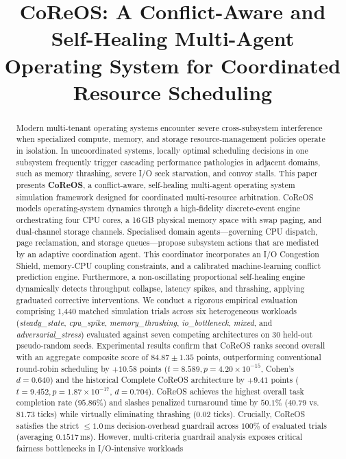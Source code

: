 \documentclass[conference]{IEEEtran}
\begin{document}
\title{CoReOS: A Conflict-Aware and Self-Healing Multi-Agent Operating System for Coordinated Resource Scheduling}

\author{
}

\maketitle

\begin{abstract}
Modern multi-tenant operating systems encounter severe cross-subsystem interference when specialized compute, memory, and storage resource-management policies operate in isolation. In uncoordinated systems, locally optimal scheduling decisions in one subsystem frequently trigger cascading performance pathologies in adjacent domains, such as memory thrashing, severe I/O seek starvation, and convoy stalls. This paper presents \textbf{CoReOS}, a conflict-aware, self-healing multi-agent operating system simulation framework designed for coordinated multi-resource arbitration. CoReOS models operating-system dynamics through a high-fidelity discrete-event engine orchestrating four CPU cores, a 16\,GB physical memory space with swap paging, and dual-channel storage channels. Specialised domain agents—governing CPU dispatch, page reclamation, and storage queues—propose subsystem actions that are mediated by an adaptive coordination agent. This coordinator incorporates an I/O Congestion Shield, memory-CPU coupling constraints, and a calibrated machine-learning conflict prediction engine. Furthermore, a non-oscillating proportional self-healing engine dynamically detects throughput collapse, latency spikes, and thrashing, applying graduated corrective interventions. We conduct a rigorous empirical evaluation comprising 1,440 matched simulation trials across six heterogeneous workloads (\textit{steady\_state}, \textit{cpu\_spike}, \textit{memory\_thrashing}, \textit{io\_bottleneck}, \textit{mixed}, and \textit{adversarial\_stress}) evaluated against seven competing architectures on 30 held-out pseudo-random seeds. Experimental results confirm that CoReOS ranks second overall with an aggregate composite score of $84.87 \pm 1.35$ points, outperforming conventional round-robin scheduling by $+10.58$ points ($t=8.589, p=4.20 \times 10^{-15}$, Cohen's $d=0.640$) and the historical Complete CoReOS architecture by $+9.41$ points ($t=9.452, p=1.87 \times 10^{-17}$, $d=0.704$). CoReOS achieves the highest overall task completion rate ($95.86\%$) and slashes penalized turnaround time by $50.1\%$ ($40.79$ vs. $81.73$ ticks) while virtually eliminating thrashing ($0.02$ ticks). Crucially, CoReOS satisfies the strict $\le 1.0$\,ms decision-overhead guardrail across $100\%$ of evaluated trials (averaging $0.1517$\,ms). However, multi-criteria guardrail analysis exposes critical fairness bottlenecks in I/O-intensive workloads 
\end{abstract}
\end{document}
